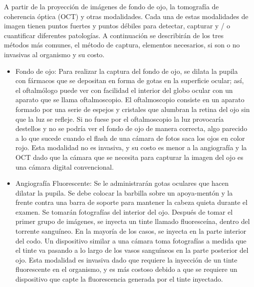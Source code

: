 A partir de la proyecci\'on de im\'agenes de fondo de ojo, la tomograf\'ia de coherencia \'optica (OCT) y otras modalidades. Cada una de estas modalidades de imagen tienen puntos fuertes y puntos d\'ebiles para detectar, capturar y / o cuantificar diferentes patolog\'ias.
A continuaci\'on se describir\'an de los tres m\'etodos m\'as comunes, el m\'etodo de captura, elementos necesarios, si son o no invasivas al organismo y su costo.
\begin{itemize}
	\item Fondo de ojo: Para realizar la captura del fondo de ojo, se dilata la pupila con f\'armacos que se depositan en forma de gotas en la superficie ocular; as\'i, el oftalm\'ologo puede ver con facilidad el interior del globo ocular con un aparato que se llama oftalmoscopio. El oftalmoscopio consiste en un aparato formado por una serie de espejos y cristales que alumbran la retina del ojo sin que la luz se refleje. Si no fuese por el oftalmoscopio la luz provocar\'ia destellos y no se podr\'ia ver el fondo de ojo de manera correcta, algo parecido a lo que sucede cuando el flash de una c\'amara de fotos saca los ojos en color rojo. Esta modalidad no es invasiva, y su costo es menor a la angiograf\'ia y la OCT dado que la cámara que se necesita para capturar la imagen del ojo es una c\'amara digital convencional.
\item Angiograf\'ia Fluorescente: Se le administrar\'an gotas oculares que hacen dilatar la pupila. Se debe colocar la barbilla sobre un apoya-ment\'on y la frente contra una barra de soporte para mantener la cabeza quieta durante el examen. Se tomar\'an fotograf\'ias del interior del ojo. Despu\'es de tomar el primer grupo de im\'agenes, se inyecta un tinte llamado fluoresce\'ina, dentro del  torrente sangu\'ineo. En la mayor\'ia de los casos, se inyecta en la parte interior del codo. Un dispositivo similar a una c\'amara toma fotograf\'ias a medida que el tinte va pasando a lo largo de los vasos sangu\'ineos en la parte posterior del ojo. Esta modalidad es invasiva dado que requiere la inyecci\'on de  un tinte fluorescente en el organismo, y es m\'as costoso debido a que se requiere un dispositivo que capte la fluorescencia generada por el tinte inyectado.

\end{itemize}
